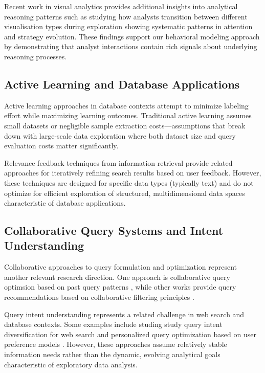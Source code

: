 \documentclass[sigconf, nonacm]{acmart}
\begin{document}
Recent work in visual analytics provides additional insights into analytical reasoning patterns such as studying how analysts transition between different visualisation types during exploration \cite{liu2018bridging} showing systematic patterns in attention and strategy evolution. These findings support our behavioral modeling approach by demonstrating that analyst interactions contain rich signals about underlying reasoning processes.

\subsection{Active Learning and Database Applications}

Active learning approaches in database contexts attempt to minimize labeling effort while maximizing learning outcomes. Traditional active learning assumes small datasets or negligible sample extraction costs—assumptions that break down with large-scale data exploration where both dataset size and query evaluation costs matter significantly.

Relevance feedback techniques from information retrieval \cite{rocchio1971relevance} provide related approaches for iteratively refining search results based on user feedback. However, these techniques are designed for specific data types (typically text) and do not optimize for efficient exploration of structured, multidimensional data spaces characteristic of database applications.

\subsection{Collaborative Query Systems and Intent Understanding}

Collaborative approaches to query formulation and optimization represent another relevant research direction. One approach is collaborative query optimsion based on past query patterns \cite{khoussainova2009perfxact}, while other works provide query recommendations based on collaborative filtering principles \cite{stefanidis2009you}.

Query intent understanding represents a related challenge in web search and database contexts. Some examples include studing study query intent diversification for web search \cite{agrawal2009diversifying} and personalized query optimization based on user preference models \cite{koutrika2005constrained}. However, these approaches assume relatively stable information needs rather than the dynamic, evolving analytical goals characteristic of exploratory data analysis.
\end{document}
